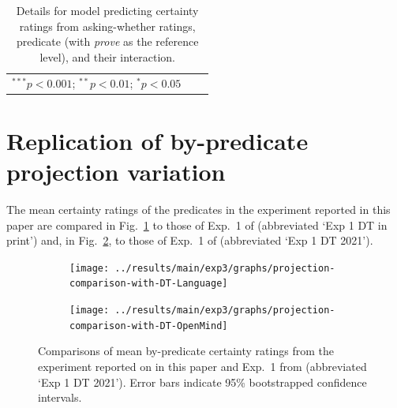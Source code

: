 \documentclass[11pt,fleqn]{article}
\newcommand{\6}{\mbox{$[\hspace*{-.6mm}[$}}
\newcommand{\9}{\mbox{$]\hspace*{-.6mm}]$}}
\begin{document}
\begin{table}
\begin{center}
\begin{tabular}{l r r l}
\bottomrule %
\multicolumn{2}{l}{\scriptsize{$^{***}p<0.001$; $^{**}p<0.01$; $^{*}p<0.05$}}
\end{tabular}
\caption{Details for model predicting certainty ratings from asking-whether ratings, predicate (with {\em prove} as the reference level), and their interaction.}
\label{table:coefficients-ai}
\end{center}
\end{table}

\newpage

\section{Replication of by-predicate projection variation}\label{a-replication}

The mean certainty ratings of the predicates in the experiment reported  in this paper are compared in Fig.~\ref{fig:comparison-language} to those of Exp.~1 of \citealt{degen-tonhauser-language} (abbreviated `Exp 1 DT in print') and, in Fig.~\ref{fig:comparison-openmind}, to those of  Exp.~1 of \citealt{degen-tonhauser-openmind} (abbreviated `Exp 1 DT 2021'). 

\begin{figure}[h!]
\centering
\begin{subfigure}[t]{0.5\textwidth}
        \centering
\texttt{[image: ../results/main/exp3/graphs/projection-comparison-with-DT-Language]}
\caption{}\label{fig:comparison-language}
 \end{subfigure}%
\begin{subfigure}[t]{0.5\textwidth}
\centering
\texttt{[image: ../results/main/exp3/graphs/projection-comparison-with-DT-OpenMind]}
\caption{}\label{fig:comparison-openmind}
\end{subfigure}
\caption{Comparisons of mean by-predicate certainty ratings from the experiment reported on in this paper and Exp.~1 from \citealt{degen-tonhauser-openmind} (abbreviated `Exp 1 DT 2021'). Error bars indicate 95\% bootstrapped confidence intervals.} 
\label{f-comparison}
\end{figure}
\end{document}
